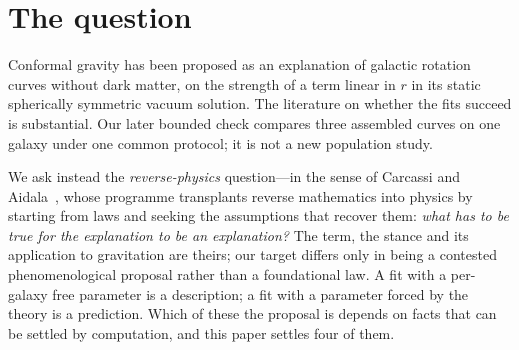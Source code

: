 \documentclass[11pt]{article}
\theoremstyle{definition}
\theoremstyle{remark}
\begin{document}
\begin{abstract}
What the assembly gives is a map of the assumption rather than a result.  The
linear coefficient decomposes as \(\gamma=\gamma_{0}+\gamma_{*}(M)\), a
boundary datum plus a sourced piece, which is the parametrisation the
rotation-curve fits already use~\cite{MannheimOBrien2012}.  That sits awkwardly
with our own Tully--Fisher conditional, which says a mass-proportional piece
moves the slope, whereas those fits retain both terms and report success over
a large sample.  A later bounded comparison on NGC~3198 does not resolve that
population-level dispute: Mannheim has the smaller unweighted residual, while
GR plus an NFW halo has the smaller uncertainty-weighted score and is the only
one of the three declared models to pass the random-error gate.  The underlying dispute is live and more
than a decade old~\cite{Horne2016,HobsonLasenby2021,Mannheim2022,%
HobsonLasenby2022}, and its crux is not algebraic: both sides agree on the
transformation law and disagree over whether the mass-generating scalar is
macroscopic or microscopic.  Exact computation takes such premises as input.
It cannot settle this one, and we do not pretend otherwise.
\end{abstract}

\section{The question}

Conformal gravity has been proposed as an explanation of galactic rotation
curves without dark matter, on the strength of a term linear in \(r\) in its
static spherically symmetric vacuum solution.  The literature on whether the
fits succeed is substantial.  Our later bounded check compares three assembled
curves on one galaxy under one common protocol; it is not a new population
study.

We ask instead the \emph{reverse-physics} question---in the sense of Carcassi
and Aidala~\cite{CarcassiAidala2022,AoP}, whose programme transplants reverse
mathematics into physics by starting from laws and seeking the assumptions
that recover them: \emph{what has to be true for the explanation to be an
explanation?}  The term, the stance and its application to gravitation are
theirs; our target differs only in being a contested phenomenological
proposal rather than a foundational law.  A fit with a per-galaxy free
parameter is a description; a fit with a parameter forced by the theory is a
prediction.  Which of these the proposal is depends on facts that can be
settled by computation, and this paper settles four of them.
\end{document}
